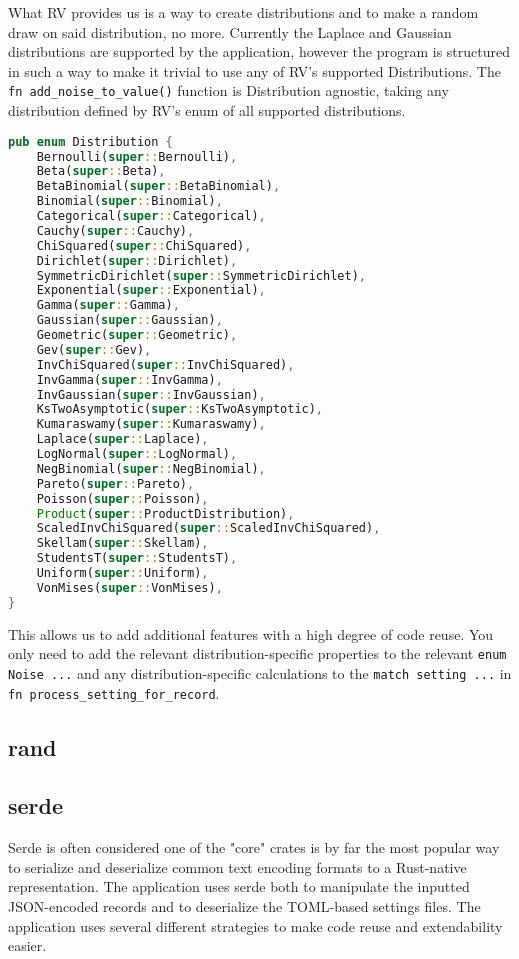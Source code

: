 What RV provides us is a way to create distributions and to make a random draw on said distribution, no more. Currently the Laplace and Gaussian distributions are supported by the application, however the program is structured in such a way to make it trivial to use any of RV's supported Distributions. The \texttt{fn add\_noise\_to\_value()} function is Distribution agnostic, taking any distribution defined by RV's enum of all supported distributions.

\begin{lstlisting}[language=Rust, caption={Enum from rv::dist::distribution}, label={rv-enum}]
pub enum Distribution {
    Bernoulli(super::Bernoulli),
    Beta(super::Beta),
    BetaBinomial(super::BetaBinomial),
    Binomial(super::Binomial),
    Categorical(super::Categorical),
    Cauchy(super::Cauchy),
    ChiSquared(super::ChiSquared),
    Dirichlet(super::Dirichlet),
    SymmetricDirichlet(super::SymmetricDirichlet),
    Exponential(super::Exponential),
    Gamma(super::Gamma),
    Gaussian(super::Gaussian),
    Geometric(super::Geometric),
    Gev(super::Gev),
    InvChiSquared(super::InvChiSquared),
    InvGamma(super::InvGamma),
    InvGaussian(super::InvGaussian),
    KsTwoAsymptotic(super::KsTwoAsymptotic),
    Kumaraswamy(super::Kumaraswamy),
    Laplace(super::Laplace),
    LogNormal(super::LogNormal),
    NegBinomial(super::NegBinomial),
    Pareto(super::Pareto),
    Poisson(super::Poisson),
    Product(super::ProductDistribution),
    ScaledInvChiSquared(super::ScaledInvChiSquared),
    Skellam(super::Skellam),
    StudentsT(super::StudentsT),
    Uniform(super::Uniform),
    VonMises(super::VonMises),
}
\end{lstlisting}

This allows us to add additional features with a high degree of code reuse. You only need to add the relevant distribution-specific properties to the relevant \texttt{enum Noise {...}} and any distribution-specific calculations to the \texttt{match setting {...}} in \texttt{fn process\_setting\_for\_record}. 

\subsection{rand}

\subsection{serde}
Serde is often considered one of the "core" crates is by far the most popular way to serialize and deserialize common text encoding formats to a Rust-native representation. The application uses serde both to manipulate the inputted JSON-encoded records and to deserialize the TOML-based settings files. The application uses several different strategies to make code reuse and extendability easier.


